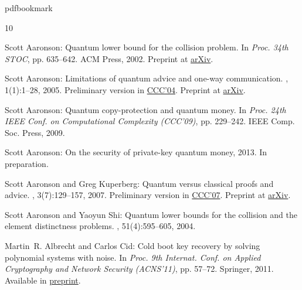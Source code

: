 %
%
%
%
%
\providecommand{\bibhead}[1]{}
%
\expandafter\ifx\csname pdfbookmark\endcsname\relax%
  \providecommand{\tocrefpdfbookmark}{}
\else\providecommand{\tocrefpdfbookmark}{%
   \hypertarget{tocreferences}{}%
   \pdfbookmark[1]{References}{tocreferences}}%
\fi

\tocrefpdfbookmark
\begin{thebibliography}{10}

\bibhead{aar:col}
{\sc Scott Aaronson}: Quantum lower bound for the collision problem.
\newblock In {\em Proc. 34th STOC}, pp. 635--642. ACM Press, 2002.
\newblock Preprint at \href{http://arxiv.org/abs/quant-ph/0111102}{arXiv}.
\newblock [\epfmtdoi{10.1145/509907.509999}]

\bibhead{aar:adv}
{\sc Scott Aaronson}: Limitations of quantum advice and one-way communication.
, 1(1):1--28, 2005.
\newblock Preliminary version in
  \href{http://dx.doi.org/10.1109/CCC.2004.1313854}{CCC'04}. Preprint at
  \href{http://arxiv.org/abs/quant-ph/0402095}{arXiv}.

\bibhead{aar:qcopy}
{\sc Scott Aaronson}: Quantum copy-protection and quantum money.
\newblock In {\em Proc. 24th IEEE Conf. on Computational Complexity (CCC'09)},
  pp. 229--242. IEEE Comp. Soc. Press, 2009.

\bibhead{aar:private}
{\sc Scott Aaronson}: On the security of private-key quantum money, 2013.
\newblock In preparation.

\bibhead{ak}
{\sc Scott Aaronson and Greg Kuperberg}: Quantum versus classical proofs and
  advice.
, 3(7):129--157, 2007.
\newblock Preliminary version in
  \href{http://dx.doi.org/10.1109/CCC.2007.27}{CCC'07}. Preprint at
  \href{http://arxiv.org/abs/quant-ph/0604056}{arXiv}.

\bibhead{aar:col-jacm}
{\sc Scott Aaronson and Yaoyun Shi}: Quantum lower bounds for the collision and
  the element distinctness problems.
, 51(4):595--605, 2004.
\newblock [\epfmtdoi{10.1145/1008731.1008735}]

\bibhead{ac:psn}
{\sc Martin~R. Albrecht and Carlos Cid}: Cold boot key recovery by solving
  polynomial systems with noise.
\newblock In {\em Proc. 9th Internat. Conf. on Applied Cryptography and Network
  Security (ACNS'11)}, pp. 57--72. Springer, 2011.
\newblock Available in \href{http://eprint.iacr.org/2011/038}{preprint}.
\newblock [\epfmtdoi{10.1007/978-3-642-21554-4\_4}]


\end{thebibliography}
